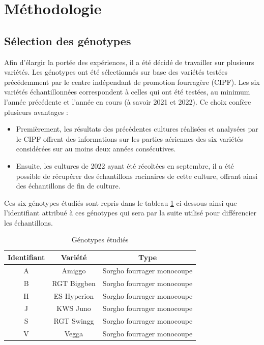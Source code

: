 \section{Méthodologie}

\subsection{Sélection des génotypes}
Afin d'élargir la portée des expériences, il a été décidé de travailler sur plusieurs variétés.
Les génotypes ont été sélectionnés sur base des variétés testées précédemment par le centre indépendant de promotion fourragère (CIPF).
Les six variétés échantillonnées correspondent à celles qui ont été testées, au minimum l'année précédente et l'année en cours (à savoir 2021 et 2022).
Ce choix confère plusieurs avantages :
\begin{itemize}
    \item Premièrement, les résultats des précédentes cultures réalisées et analysées par le CIPF offrent des informations sur les parties aériennes des six variétés considérées sur au moins deux années consécutives.
    \item Ensuite, les cultures de 2022 ayant été récoltées en septembre, il a été possible de récupérer des échantillons racinaires de cette culture, offrant ainsi des échantillons de fin de culture.
\end{itemize}
Ces six génotypes étudiés sont repris dans le tableau \ref{tab:variete} ci-dessous ainsi que l'identifiant attribué à ces génotypes qui sera par la suite utilisé pour différencier les échantillons.

\begin{table}[ht]
    \centering
    \caption{Génotypes étudiés}
    \begin{tabular}{c c c}
        \hline
        \textbf{Identifiant} & \textbf{Variété} & \textbf{Type} \\
        \hline
        \hline
        A & Amiggo & Sorgho fourrager monocoupe \\
        B & RGT Biggben & Sorgho fourrager monocoupe \\
        H & ES Hyperion & Sorgho fourrager monocoupe \\
        J & KWS Juno & Sorgho fourrager monocoupe \\
        S & RGT Swingg & Sorgho fourrager monocoupe \\
        V & Vegga & Sorgho fourrager monocoupe
    \end{tabular}
    \label{tab:variete}
\end{table}


